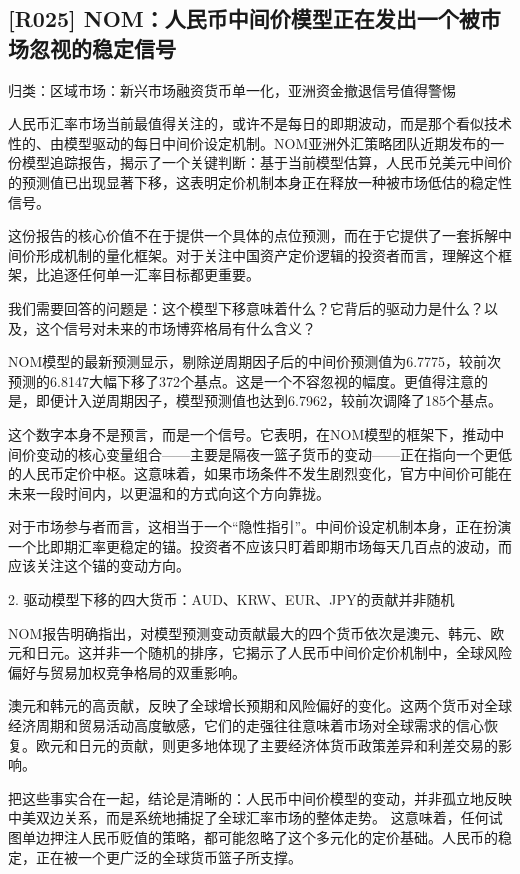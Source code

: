 \documentclass[11pt]{ctexart}
\begin{document}
\subsection{[R025] NOM：人民币中间价模型正在发出一个被市场忽视的稳定信号}
{\small\color{refgray}归类：区域市场：新兴市场融资货币单一化，亚洲资金撤退信号值得警惕}

人民币汇率市场当前最值得关注的，或许不是每日的即期波动，而是那个看似技术性的、由模型驱动的每日中间价设定机制。NOM亚洲外汇策略团队近期发布的一份模型追踪报告，揭示了一个关键判断：基于当前模型估算，人民币兑美元中间价的预测值已出现显著下移，这表明定价机制本身正在释放一种被市场低估的稳定性信号。

这份报告的核心价值不在于提供一个具体的点位预测，而在于它提供了一套拆解中间价形成机制的量化框架。对于关注中国资产定价逻辑的投资者而言，理解这个框架，比追逐任何单一汇率目标都更重要。

我们需要回答的问题是：这个模型下移意味着什么？它背后的驱动力是什么？以及，这个信号对未来的市场博弈格局有什么含义？

NOM模型的最新预测显示，剔除逆周期因子后的中间价预测值为6.7775，较前次预测的6.8147大幅下移了372个基点。这是一个不容忽视的幅度。更值得注意的是，即便计入逆周期因子，模型预测值也达到6.7962，较前次调降了185个基点。

这个数字本身不是预言，而是一个信号。它表明，在NOM模型的框架下，推动中间价变动的核心变量组合——主要是隔夜一篮子货币的变动——正在指向一个更低的人民币定价中枢。这意味着，如果市场条件不发生剧烈变化，官方中间价可能在未来一段时间内，以更温和的方式向这个方向靠拢。

对于市场参与者而言，这相当于一个“隐性指引”。中间价设定机制本身，正在扮演一个比即期汇率更稳定的锚。投资者不应该只盯着即期市场每天几百点的波动，而应该关注这个锚的变动方向。

2. 驱动模型下移的四大货币：AUD、KRW、EUR、JPY的贡献并非随机

NOM报告明确指出，对模型预测变动贡献最大的四个货币依次是澳元、韩元、欧元和日元。这并非一个随机的排序，它揭示了人民币中间价定价机制中，全球风险偏好与贸易加权竞争格局的双重影响。

澳元和韩元的高贡献，反映了全球增长预期和风险偏好的变化。这两个货币对全球经济周期和贸易活动高度敏感，它们的走强往往意味着市场对全球需求的信心恢复。欧元和日元的贡献，则更多地体现了主要经济体货币政策差异和利差交易的影响。

把这些事实合在一起，结论是清晰的：人民币中间价模型的变动，并非孤立地反映中美双边关系，而是系统地捕捉了全球汇率市场的整体走势。 这意味着，任何试图单边押注人民币贬值的策略，都可能忽略了这个多元化的定价基础。人民币的稳定，正在被一个更广泛的全球货币篮子所支撑。
\end{document}
